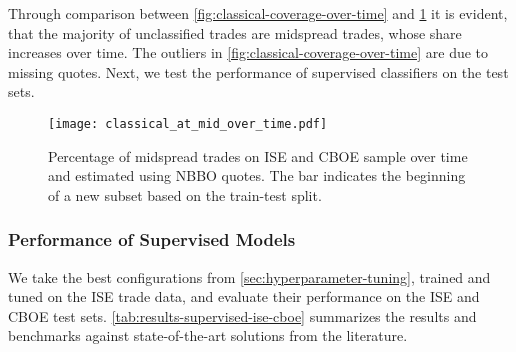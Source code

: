 Through comparison between \cref{fig:classical-coverage-over-time} and \cref{fig:classical-at-mid-over-time} it is evident, that the majority of unclassified trades are midspread trades, whose share increases over time. The outliers in \cref{fig:classical-coverage-over-time} are due to missing quotes.
Next, we test the performance of supervised classifiers on the test sets.

\begin{figure}[!ht]
    \centering
    \texttt{[image: classical\_at\_mid\_over\_time.pdf]}
    \caption[Mid-Spread Trades Over Time]{Percentage of midspread trades on \gls{ISE} and \gls{CBOE} sample over time and estimated using \gls{NBBO} quotes. The bar \myline{} indicates the beginning of a new subset based on the train-test split.}
    \label{fig:classical-at-mid-over-time}
\end{figure}

\subsubsection{Performance of Supervised
    Models}\label{sec:results-of-supervised-models}

We take the best configurations from \cref{sec:hyperparameter-tuning}, trained and tuned on the \gls{ISE} trade data, and evaluate their performance on the \gls{ISE} and \gls{CBOE} test sets. \cref{tab:results-supervised-ise-cboe} summarizes the results and benchmarks against state-of-the-art solutions from the literature.

